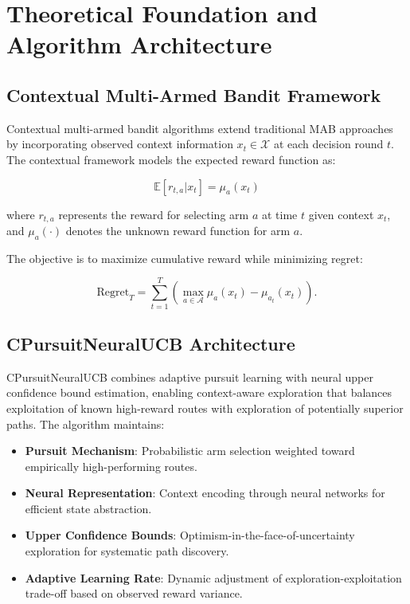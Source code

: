 \documentclass[12pt,a4paper]{article}
\begin{document}
\newpage
\section{Theoretical Foundation and Algorithm Architecture}

\subsection{Contextual Multi-Armed Bandit Framework}

Contextual multi-armed bandit algorithms extend traditional MAB approaches by incorporating observed context information $x_t \in \mathcal{X}$ at each decision round $t$. The contextual framework models the expected reward function as:

\begin{equation}
\mathbb{E}[r_{t,a} | x_t] = \mu_a(x_t)
\end{equation}

where $r_{t,a}$ represents the reward for selecting arm $a$ at time $t$ given context $x_t$, and $\mu_a(\cdot)$ denotes the unknown reward function for arm $a$.

The objective is to maximize cumulative reward while minimizing regret:

\begin{equation}
\text{Regret}_T = \sum_{t=1}^{T} \left(\max_{a \in \mathcal{A}} \mu_a(x_t) - \mu_{a_t}(x_t)\right).
\end{equation}

\subsection{CPursuitNeuralUCB Architecture}

CPursuitNeuralUCB combines adaptive pursuit learning with neural upper confidence bound estimation, enabling context-aware exploration that balances exploitation of known high-reward routes with exploration of potentially superior paths. The algorithm maintains:

\begin{itemize}
\item \textbf{Pursuit Mechanism}: Probabilistic arm selection weighted toward empirically high-performing routes.
\item \textbf{Neural Representation}: Context encoding through neural networks for efficient state abstraction.
\item \textbf{Upper Confidence Bounds}: Optimism-in-the-face-of-uncertainty exploration for systematic path discovery.
\item \textbf{Adaptive Learning Rate}: Dynamic adjustment of exploration-exploitation trade-off based on observed reward variance.
\end{itemize}
\end{document}
